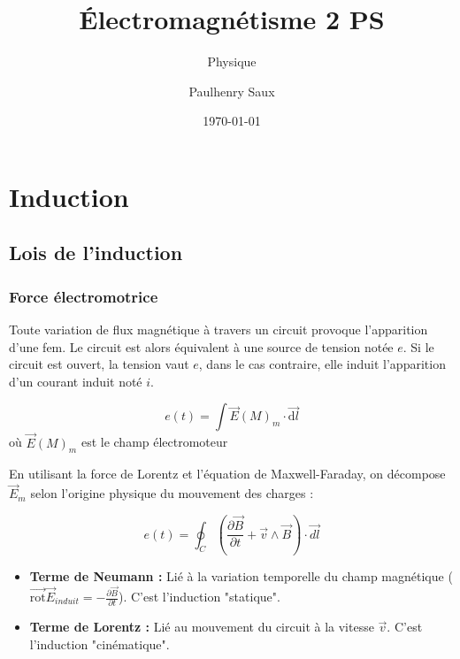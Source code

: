 \documentclass[french]{yLectureNote}
\title{Électromagnétisme 2 PS}
\subtitle{Physique}
\author{Paulhenry Saux}
\date{\today}
\renewcommand{\vec}{\overrightarrow}
\newcommand{\dd}{\mathrm{d}}
\newcommand{\E}{\vec{E}(M)}
\begin{document}
\chapter{Induction}
\section{Lois de l'induction}
\subsection{Force électromotrice}
\begin{definition}
    Toute variation de flux magnétique à travers un circuit provoque l'apparition d'une fem. Le circuit est alors équivalent à
    une source de tension notée $e$. Si le circuit est ouvert, la tension vaut $e$, dans le cas contraire, elle induit l'apparition d'un courant induit noté $i$.

    $$e(t) = \int \E_m\cdot \vec{\dd l}$$ où $\E_m$ est le champ électromoteur
\end{definition}
En utilisant la force de Lorentz et l'équation de Maxwell-Faraday, on décompose $\vec{E}_m$ selon l'origine physique du mouvement des charges :
\begin{theorem}
    $$e(t) = \oint_C \left( \frac{\partial \vec{B}}{\partial t} + \vec{v} \wedge \vec{B} \right) \cdot \vec{dl}$$
\end{theorem}
\begin{itemize}
    \item \textbf{Terme de Neumann :} Lié à la variation temporelle du champ magnétique ($\vec{\text{rot}} \vec{E}_{induit} = -\frac{\partial \vec{B}}{\partial t}$). C'est l'induction "statique".
    \item \textbf{Terme de Lorentz :} Lié au mouvement du circuit à la vitesse $\vec{v}$. C'est l'induction "cinématique".
\end{itemize}
\end{document}
